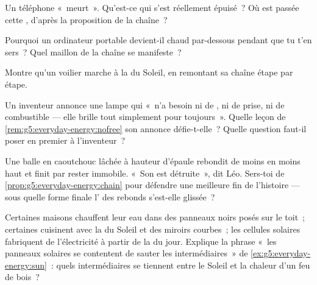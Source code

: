 \begin{exercise}[$\star$]\label{exo:g5:everyday-energy:6}
Un téléphone «~meurt~». Qu'est-ce qui s'est réellement épuisé~? Où
est passée cette , d'après la proposition de la chaîne~?
\end{exercise}

\begin{exercise}[$\star$]\label{exo:g5:everyday-energy:7}
Pourquoi un ordinateur portable devient-il chaud par-dessous pendant
que tu t'en sers~? Quel maillon de la chaîne se manifeste~?
\end{exercise}

\begin{exercise}[$\star$]\label{exo:g5:everyday-energy:8}
Montre qu'un voilier marche à la  du Soleil, en remontant sa
chaîne étape par étape.
\end{exercise}

\begin{exercise}[$\star\star$]\label{exo:g5:everyday-energy:9}
Un inventeur annonce une lampe qui «~n'a besoin ni de , ni de
prise, ni de combustible --- elle brille tout simplement pour
toujours~». Quelle leçon de \cref{rem:g5:everyday-energy:nofree} son
annonce défie-t-elle~? Quelle question faut-il poser en premier à
l'inventeur~?
\end{exercise}

\begin{exercise}[$\star\star$]\label{exo:g5:everyday-energy:10}
Une balle en caoutchouc lâchée à hauteur d'épaule rebondit de moins
en moins haut et finit par rester immobile. «~Son  est
détruite~», dit Léo. Sers-toi de \cref{prop:g5:everyday-energy:chain}
pour défendre une meilleure fin de l'histoire --- sous quelle forme
finale l' des rebonds s'est-elle glissée~?
\end{exercise}

\begin{exercise}[$\star\star$]\label{exo:g5:everyday-energy:11}
Certaines maisons chauffent leur eau dans des panneaux noirs posés
sur le toit~; certaines cuisinent avec la  du Soleil et des
miroirs courbes~; les cellules solaires fabriquent de l'électricité à
partir de la  du jour. Explique la phrase «~les panneaux
solaires se contentent de sauter les intermédiaires~» de
\cref{ex:g5:everyday-energy:sun}~: quels intermédiaires se tiennent
entre le Soleil et la chaleur d'un feu de bois~?
\end{exercise}
